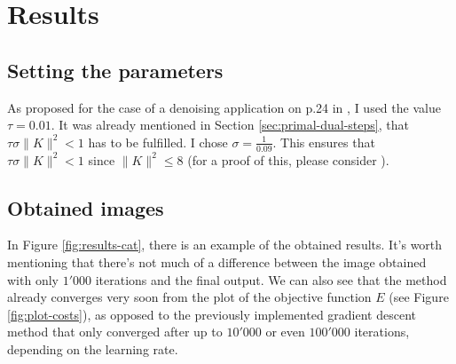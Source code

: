 \documentclass{paper}
\begin{document}
\section{Results}
\subsection{Setting the parameters}
As proposed for the case of a denoising application on p.24 in \cite{chambolle2011first}, I used the value $\tau = 0.01$. It was already mentioned in Section \ref{sec:primal-dual-steps}, that $\tau \sigma \|K\|^2 < 1$ has to be fulfilled. I chose $\sigma = \frac{1}{0.09}$. This ensures that $\tau \sigma \|K\|^2 < 1$ since $\|K\|^2 \leq 8$ (for a proof of this, please consider \cite{chambolle2004algorithm}).
\subsection{Obtained images}
In Figure \ref{fig:results-cat}, there is an example of the obtained results. It's worth mentioning that there's not much of a difference between the image obtained with only $1'000$ iterations and the final output. We can also see that the method already converges very soon from the plot of the objective function $E$ (see Figure \ref{fig:plot-costs}), as opposed to the previously implemented gradient descent method that only converged after up to $10'000$ or even $100'000$ iterations, depending on the learning rate.
\end{document}
